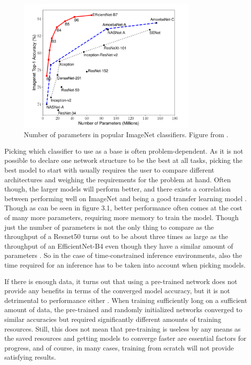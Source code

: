 \begin{figure}[h!] 
\centering 
\includegraphics[width=0.8\textwidth]{imgs/imagenet_parameters.png}
\caption{Number of parameters in popular ImageNet classifiers. Figure from \citep{efficientNet}.\label{fig:params}}
\end{figure}

Picking which classifier to use as a base is often problem-dependent. As it is not possible to declare one network structure to be the best at all tasks, picking the best model to start with usually requires the user to compare different architectures and weighing the requirements for the problem at hand. Often though, the larger models will perform better, and there exists a correlation between performing well on ImageNet and being a good transfer learning model \citep{betterTransfer}. Though as can be seen in figure 3.1, better performance often comes at the cost of many more parameters, requiring more memory to train the model. Though just the number of parameters is not the only thing to compare as the throughput of a Resnet50 turns out to be about three times as large as the throughput of an EfficientNet-B4 even though they have a similar amount of parameters \citep{classifierPerformance}. So in the case of time-constrained inference environments, also the time required for an inference has to be taken into account when picking models.

If there is enough data, it turns out that using a pre-trained network does not provide any benefits in terms of the converged model accuracy, but it is not detrimental to performance either \citep{rethinkTransfer}. When training sufficiently long on a sufficient amount of data, the pre-trained and randomly initialized networks converged to similar accuracies but required significantly different amounts of training resources. Still, this does not mean that pre-training is useless by any means as the saved resources and getting models to converge faster are essential factors for progress, and of course, in many cases, training from scratch will not provide satisfying results.

